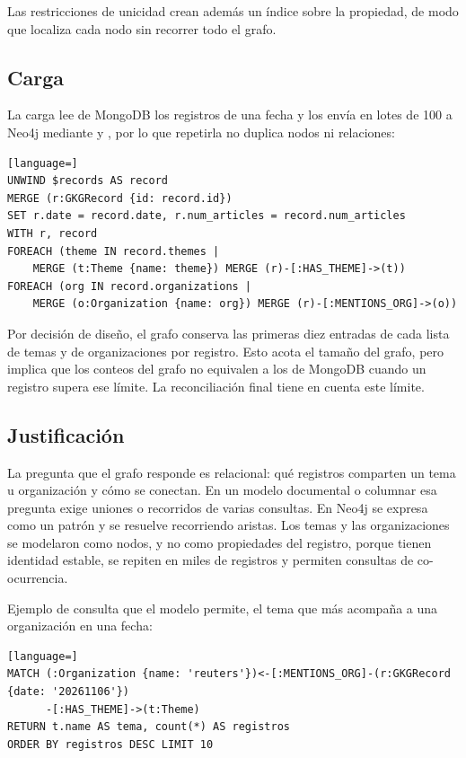 \documentclass[11pt,a4paper]{article}
\newcommand{\code}[1]{\detokenize{#1}}
\begin{document}
Las restricciones de unicidad crean además un índice sobre la propiedad, de modo que \code{MERGE} localiza cada nodo sin recorrer todo el grafo.

\subsection{Carga}

La carga lee de MongoDB los registros de una fecha y los envía en lotes de 100 a Neo4j mediante \code{UNWIND} y \code{MERGE}, por lo que repetirla no duplica nodos ni relaciones:

\begin{lstlisting}[language=]
UNWIND $records AS record
MERGE (r:GKGRecord {id: record.id})
SET r.date = record.date, r.num_articles = record.num_articles
WITH r, record
FOREACH (theme IN record.themes |
    MERGE (t:Theme {name: theme}) MERGE (r)-[:HAS_THEME]->(t))
FOREACH (org IN record.organizations |
    MERGE (o:Organization {name: org}) MERGE (r)-[:MENTIONS_ORG]->(o))
\end{lstlisting}

Por decisión de diseño, el grafo conserva las primeras diez entradas de cada lista de temas y de organizaciones por registro. Esto acota el tamaño del grafo, pero implica que los conteos del grafo no equivalen a los de MongoDB cuando un registro supera ese límite. La reconciliación final tiene en cuenta este límite.

\subsection{Justificación}

La pregunta que el grafo responde es relacional: qué registros comparten un tema u organización y cómo se conectan. En un modelo documental o columnar esa pregunta exige uniones o recorridos de varias consultas. En Neo4j se expresa como un patrón y se resuelve recorriendo aristas. Los temas y las organizaciones se modelaron como nodos, y no como propiedades del registro, porque tienen identidad estable, se repiten en miles de registros y permiten consultas de co-ocurrencia.

Ejemplo de consulta que el modelo permite, el tema que más acompaña a una organización en una fecha:

\begin{lstlisting}[language=]
MATCH (:Organization {name: 'reuters'})<-[:MENTIONS_ORG]-(r:GKGRecord {date: '20261106'})
      -[:HAS_THEME]->(t:Theme)
RETURN t.name AS tema, count(*) AS registros
ORDER BY registros DESC LIMIT 10
\end{lstlisting}
\end{document}
